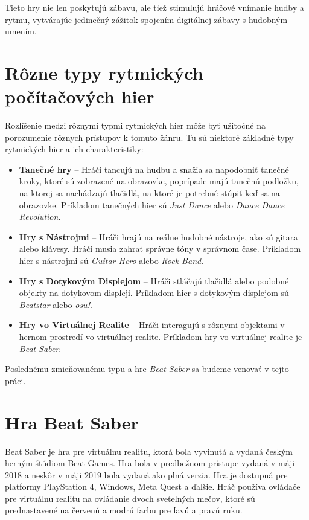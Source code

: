 Tieto hry nie len poskytujú zábavu, ale tiež stimulujú hráčové vnímanie hudby a rytmu, vytvárajúc jedinečný zážitok spojením digitálnej zábavy s hudobným umením.

\section{Rôzne typy rytmických počítačových hier}\label{sec:typy}


Rozlíšenie medzi rôznymi typmi rytmických hier môže byť užitočné na porozumenie rôznych prístupov k tomuto žánru. Tu sú niektoré základné typy rytmických hier a ich charakteristiky:

\begin{itemize}

\item \textbf{Tanečné hry} – Hráči tancujú na hudbu a snažia sa napodobniť tanečné kroky, ktoré sú zobrazené na obrazovke, poprípade majú tanečnú podložku, na ktorej sa nachádzajú tlačidlá, na ktoré je potrebné stúpiť keď sa na obrazovke. Príkladom tanečných hier sú \textit{Just Dance} alebo \textit{Dance Dance Revolution}.
\item \textbf{Hry s Nástrojmi} – Hráči hrajú na reálne hudobné nástroje, ako sú gitara alebo klávesy. Hráči musia zahrať správne tóny v správnom čase. Príkladom hier s nástrojmi sú \textit{Guitar Hero} alebo \textit{Rock Band}.
\item \textbf{Hry s Dotykovým Displejom} – Hráči stláčajú tlačidlá alebo podobné objekty na dotykovom displeji. Príkladom hier s dotykovým displejom sú \textit{Beatstar} alebo \textit{osu!}.
\item \textbf{Hry vo Virtuálnej Realite} – Hráči interagujú s rôznymi objektami v hernom prostredí vo virtuálnej realite. Príkladom hry vo virtuálnej realite je \textit{Beat Saber}.
\end{itemize}

Poslednému zmieňovanému typu a hre \textit{Beat Saber} sa budeme venovať v tejto práci. 

\section{Hra Beat Saber}\label{sec:beat_saber}

Beat Saber je hra pre virtuálnu realitu, ktorá bola vyvinutá a vydaná českým herným štúdiom Beat Games. Hra bola v predbežnom prístupe vydaná v máji 2018 a neskôr v máji 2019 bola vydaná ako plná verzia. Hra je dostupná pre platformy PlayStation 4, Windows, Meta Quest a ďalšie. Hráč používa ovládače pre virtuálnu realitu na ovládanie dvoch svetelných mečov, ktoré sú prednastavené na červenú a modrú farbu pre ľavú a pravú ruku. \cite{sutrich2020beatsaber}

